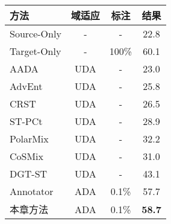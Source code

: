 \begin{table}[H]
	\renewcommand{\arraystretch}{1}
    \centering
    \setlength{\tabcolsep}{10mm}
    \label{tab:3-1}
    \wuhao
    \begin{tabular}{lccc}
        \toprule[1.5pt]
        \textbf{方法} & \textbf{域适应} & \textbf{标注} & \textbf{结果} \\
        \midrule
        Source-Only   & -          & -       & 22.8 \\
        Target-Only   & -          & 100\%       & 60.1 \\
        AADA          & UDA & -       & 23.0 \\
        AdvEnt        & UDA & -       & 25.8 \\
        CRST          & UDA & -       & 26.5 \\
        ST-PCt        & UDA & -       & 28.9 \\
        PolarMix      & UDA & -       & 32.2 \\
        CoSMix        & UDA & -       & 31.0 \\
        DGT-ST        & UDA & -       & 43.1 \\
        Annotator     & ADA   & 0.1\%     & 57.7 \\
        本章方法       & ADA   & 0.1\%     & \textbf{58.7} \\
        \bottomrule[1.5pt]
    \end{tabular}
\end{table}
